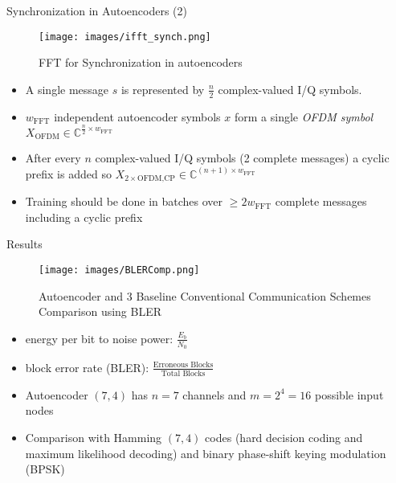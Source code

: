 \documentclass[xcolor=table,mathserif,9pt]{beamer}    %
\begin{document}
\begin{frame}{Synchronization in Autoencoders (2)}

\begin{figure}[htpb]
	\centering
	\texttt{[image: images/ifft\_synch.png]}
	\caption{FFT for Synchronization in autoencoders \cite{synch1}}
\end{figure}

\begin{itemize}
	\item A single message $s$ is represented by $\frac{n}{2}$ complex-valued I/Q symbols.
	\item $w_{\text{FFT}}$ independent autoencoder symbols $x$ form a single \emph{OFDM symbol} $X_{\text{OFDM}} \in \mathbb{C}^{\frac{n}{2} \times w_{\text{FFT}}}$
	\item After every $n$ complex-valued I/Q symbols (2 complete messages) a cyclic prefix is added so $X_{2 \times\text{OFDM,CP}} \in \mathbb{C}^{(n + 1) \times w_{\text{FFT}}}$
	\item Training should be done in batches over $\ge 2w_{\text{FFT}}$ complete messages including a cyclic prefix
\end{itemize}



\end{frame}

\begin{frame}{Results}

\begin{figure}[htpb]
	\centering
	\texttt{[image: images/BLERComp.png]}
	\caption{Autoencoder and 3 Baseline Conventional Communication Schemes Comparison using BLER \cite{DBLP:journals/corr/OSheaH17}}
\end{figure}

\begin{itemize}
	\item energy per bit to noise power: $\frac{E_b}{N_0}$
	\item block error rate (BLER): $\frac{\text{Erroneous Blocks}}{\text{Total Blocks}}$
	\item Autoencoder $(7,4)$ has $n=7$ channels and $m=2^4=16$ possible input nodes
	\item Comparison with Hamming $(7,4)$ codes (hard decision coding and maximum likelihood decoding) and 
	      binary phase-shift keying modulation (BPSK)
\end{itemize}
\end{frame}
\end{document}
